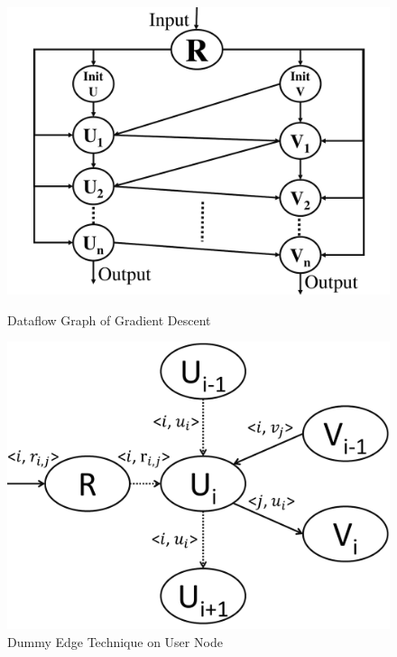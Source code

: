 \documentclass{llncs}
\begin{document}
\begin{figure}[h]
\begin{minipage}[t]{0.45\linewidth}
\centering
\includegraphics[width=\textwidth]{pics/gdGraph.pdf}
\vspace{-15pt}
\caption{Dataflow Graph of Gradient Descent \label{fig:gdGraph}}
\end{minipage}
\hfill
\begin{minipage}[t]{0.45\linewidth}
\centering
\includegraphics[width=\textwidth]{pics/dummyEdge.pdf}
\vspace{-15pt}
\caption{Dummy Edge Technique on User Node \label{fig:dummyEdge}}
\end{minipage}
\vspace{-10pt}
\end{figure}
\end{document}
